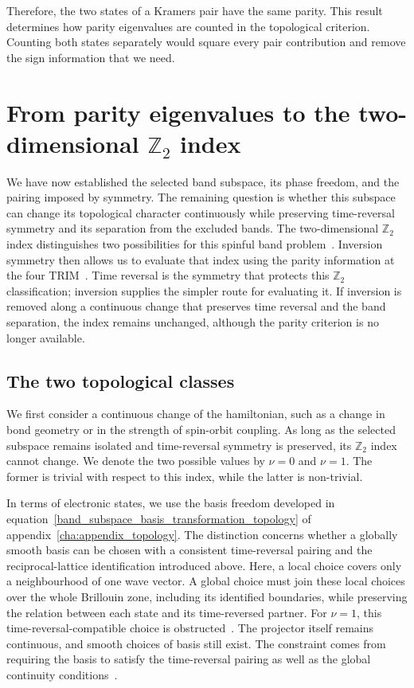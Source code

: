 Therefore, the two states of a Kramers pair have the same parity.
This result determines how parity eigenvalues are counted in the topological criterion.
Counting both states separately would square every pair contribution and remove the sign information that we need.

\newpage
\section{From parity eigenvalues to the two-dimensional \texorpdfstring{$\mathbb{Z}_2$}{Z2} index}
\label{sec:fu_kane_criterion_topology}

We have now established the selected band subspace, its phase freedom, and the pairing imposed by symmetry.
The remaining question is whether this subspace can change its topological character continuously while preserving time-reversal symmetry and its separation from the excluded bands.
The two-dimensional $\mathbb{Z}_2$ index distinguishes two possibilities for this spinful band problem~\cite{kane2005z2}.
Inversion symmetry then allows us to evaluate that index using the parity information at the four TRIM~\cite{wieder2022topological}.
Time reversal is the symmetry that protects this $\mathbb{Z}_2$ classification;
inversion supplies the simpler route for evaluating it.
If inversion is removed along a continuous change that preserves time reversal and the band separation,
the index remains unchanged, although the parity criterion is no longer available.

\subsection{The two topological classes}

We first consider a continuous change of the hamiltonian,
such as a change in bond geometry or in the strength of spin-orbit coupling.
As long as the selected subspace remains isolated and time-reversal symmetry is preserved,
its $\mathbb{Z}_2$ index cannot change.
We denote the two possible values by $\nu=0$ and $\nu=1$.
The former is trivial with respect to this index, while the latter is non-trivial.

In terms of electronic states, we use the basis freedom developed in equation~\eqref{band_subspace_basis_transformation_topology} of appendix~\ref{cha:appendix_topology}.
The distinction concerns whether a globally smooth basis can be chosen
with a consistent time-reversal pairing and the reciprocal-lattice identification introduced above.
Here, a local choice covers only a neighbourhood of one wave vector.
A global choice must join these local choices over the whole Brillouin zone, including its identified boundaries,
while preserving the relation between each state and its time-reversed partner.
For $\nu=1$, this time-reversal-compatible choice is obstructed~\cite{fu2006time}.
The projector itself remains continuous, and smooth choices of basis still exist.
The constraint comes from requiring the basis to satisfy the time-reversal pairing as well as the global continuity conditions~\cite{kane2005z2}.

